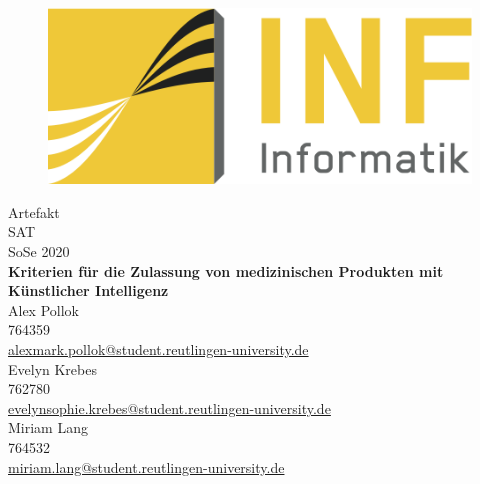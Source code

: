 \begin{titlepage}
    \begin{figure}
        \begin{flushright}
            \includegraphics[scale=0.75]{images/INFLogo.png}
        \end{flushright}
    \end{figure}

    {\centering
    \vspace{1.5cm}
    {\Large Artefakt}\\

    \vspace{0.5cm}
    {\Large SAT}\\
    {\Large SoSe 2020}\\

    \vspace{1.0cm}
    \Large{\textbf{
            Kriterien für die Zulassung von medizinischen Produkten mit Künstlicher Intelligenz
          }
    }\\

    \vspace{1.0cm}
    {\small Alex Pollok}\\
    {\small 764359}\\
    {\small \href{mailto:alex_mark.pollok@student.reutlingen-university.de}{alex{\textunderscore}mark.pollok@student.reutlingen-university.de}}\\
    \vspace{0.5cm}
    {\small Evelyn Krebes}\\
    {\small 762780}\\
    {\small \href{mailto:evelyn_sophie.krebes@student.reutlingen-university.de}{evelyn{\textunderscore}sophie.krebes@student.reutlingen-university.de}}\\
    \vspace{0.5cm}
    {\small Miriam Lang}\\
    {\small 764532}\\
    {\small \href{mailto:miriam.lang@student.reutlingen-university.de}{miriam.lang@student.reutlingen-university.de}}\\

}
\end{titlepage}
